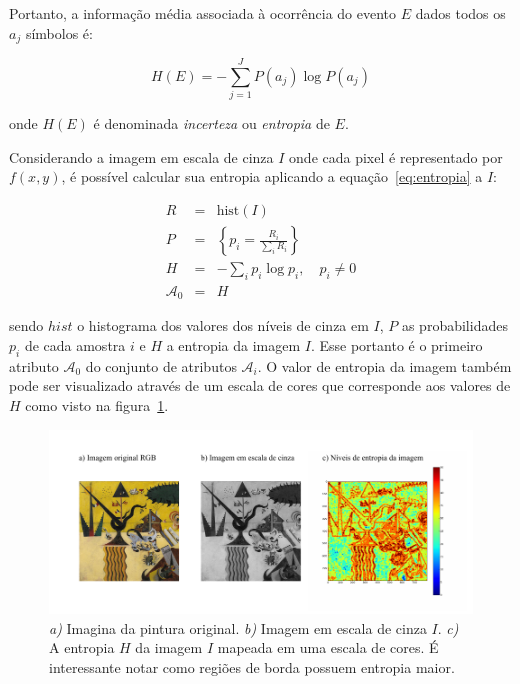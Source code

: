 Portanto, a informação média associada à ocorrência do evento $E$
dados todos os $a_j$ símbolos é:

\begin{equation}
  H(E) =  -\sum_{j=1}^J P(a_j) \log P(a_j)
  \label{eq:entropia}
\end{equation} 

\noindent onde $H(E)$ é denominada \emph{incerteza} ou \emph{entropia} de $E$.

Considerando a imagem em escala de cinza $I$ onde cada pixel é
representado por $f(x,y)$, é possível calcular sua entropia aplicando
a equação~\ref{eq:entropia} a $I$:

\begin{eqnarray}
  R & = & \text{hist}(I) \\
  P & = & \left\{ p_i = \frac{R_i}{\sum_{i} R_i} \right\}\\
  H & = & -\sum_i p_i \log p_i, \,\,\,\,\,\, p_i \neq 0 \\
  \mathcal{A}_0 & = & H
\end{eqnarray}

\noindent sendo $hist$ o histograma dos valores dos níveis de cinza em
$I$, $P$ as probabilidades $p_i$ de cada amostra $i$ e $H$ a entropia
da imagem $I$. Esse portanto é o primeiro atributo $\mathcal{A}_0$ do
conjunto de atributos $\mathcal{A}_i$. O valor de entropia da imagem
também pode ser visualizado através de um escala de cores que
corresponde aos valores de $H$ como visto na figura~\ref{fig:entrop}.

\begin{figure}[h!]
\begin{center}
      \caption{\textit{a)} Imagina da pintura original. \textit{b)}
        Imagem em escala de cinza $I$. \textit{c)} A entropia $H$ da
        imagem $I$ mapeada em uma escala de cores. É interessante
        notar como regiões de borda possuem entropia maior.}
        \label{fig:entrop}
        \includegraphics[scale=1]{figs/entrop}
        \fonteminha
\end{center}
\end{figure}

